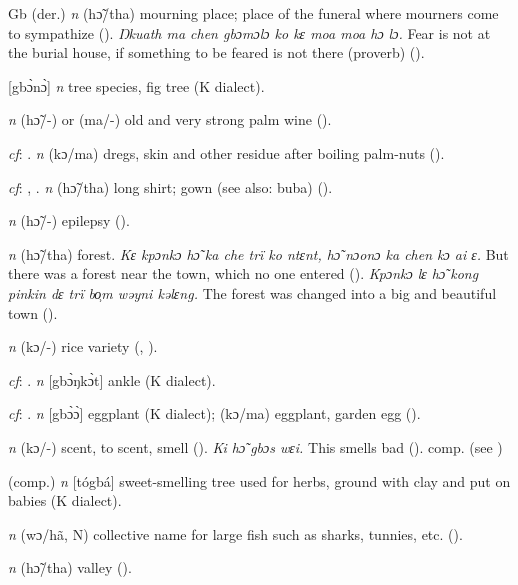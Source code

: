 \begin{letter}{Gb}
 (der.) \textit{n} (hɔ̃/tha) mourning place; place of the funeral where mourners come to sympathize (\citealt{Pichl1967}). \textit{Ŋkuath ma chen gbɔmɔlɔ ko kɛ moa moa hɔ lɔ.} Fear is not at the burial house, if something to be feared is not there (proverb) (\citealt{TISLL1979}).

 [gbɔ̀nɔ̀] \textit{n} tree species, fig tree (K dialect).

 \textit{n} (hɔ̃/-) or (ma/-) old and very strong palm wine (\citealt{Pichl1967}). 

 \textit{cf}: . \textit{n} (kɔ/ma) dregs, skin and other residue after boiling palm-nuts (\citealt{Pichl1967}).

 \textit{cf}: , . \textit{n} (hɔ̃/tha) long shirt; gown (see also: buba) (\citealt{Pichl1967}). 

 \textit{n} (hɔ̃/-) epilepsy (\citealt{Pichl1967}).

 \textit{n} (hɔ̃/tha) forest. \textit{Kɛ kpɔnkɔ hɔ̃ ka che trï ko ntɛnt, hɔ̃ nɔonɔ ka chen kɔ ai ɛ.} But there was a forest near the town, which no one entered (\citealt{Pichl1967}). \textit{Kpɔnkɔ lɛ hɔ̃ kong pinkin dɛ trï bo̹m wəyni kəlɛng.} The forest was changed into a big and beautiful town (\citealt{Pichl1967}). 

 \textit{n} (kɔ/-) rice variety (\citealt{Pichl1967}, \citealt{Sumner1921}). 

 \textit{cf}: . \textit{n} [gbɔ̀ŋkɔ̀t] ankle (K dialect). 

 \textit{cf}: . \textit{n} [gbɔ̀ɔ̀] eggplant (K dialect); (kɔ/ma) eggplant, garden egg (\citealt{Pichl1967}).

 \textit{n} (kɔ/-) scent, to scent, smell (\citealt{Pichl1967}). \textit{Ki hɔ̃ gbɔs wɛi.} This smells bad (\citealt{Pichl1967}). comp.  (see ) 

 (comp.) \textit{n} [tógbá] sweet-smelling tree used for herbs, ground with clay and put on babies (K dialect). 

 \textit{n} (wɔ/hã, N) collective name for large fish such as sharks, tunnies, etc. (\citealt{Pichl1967}). 

 \textit{n} (hɔ̃/tha) valley (\citealt{Pichl1967}).


\end{letter}
